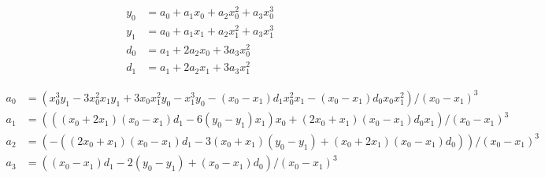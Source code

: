 \begin{align}
  y_0 & = a_0+a_1 x_0+a_2 x_0^{2}+a_3 x_0^{3}  \\
   y_1 & = a_0+a_1 x_1+a_2 x_1^{2}+a_3 x_1^{3}  \\
   d_0 & =  a_1+2 a_2 x_0+3 a_3 x_0^{2}  \\
   d_1 & = a_1+2 a_2 x_1+3 a_3 x_1^{2}  
\end{align}

 
\begin{align}
   a_0 & = \left(x_0^{3} y_1 - 3 x_0^{2} x_1 y_1+3 x_0 x_1^{2} y_0 - x_1^{3} y_0 - \left(x_0 - x_1 \right) d_1 x_0^{2} x_1 - \left(x_0 - x_1\right) d_0 x_0 x_1^{2}\right)/\left(x_0 - x_1 \right)^{3}  \\
   a_1 & = \left(\left(\left(x_0+2 x_1\right) \left(x_0 - x_1\right) d_1 -  6 \left(y_0 - y_1\right) x_1\right) x_0+\left(2 x_0+x_1\right) \left(x_0 - x_1 \right) d_0 x_1\right)/\left(x_0 - x_1\right)^{3}  \\
   a_2 & = \left( - \left(\left(2 x_0 +x_1\right) \left(x_0 - x_1\right) d_1 - 3 \left(x_0+x_1\right) \left(y_0 - y_1\right) +\left(x_0+2 x_1\right) \left(x_0 - x_1\right) d_0\right)\right)/\left(x_0 - x_1 \right)^{3}  \\
   a_3 & = \left(\left(x_0 - x_1\right) d_1 - 2 \left(y_0 - y_1\right)+\left( x_0 - x_1\right) d_0\right)/\left(x_0 - x_1\right)^{3}   
\end{align}
